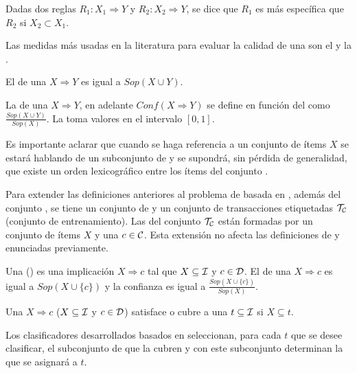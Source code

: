 \begin{defn}[Especificidad]
  Dadas dos reglas $R_1: X_1\Rightarrow Y$ y $R_2: X_2\Rightarrow Y$, se dice que $R_1$ es más específica que $R_2$ si $X_2\subset X_1$.
\label{def:especificidad}
\end{defn}

Las medidas más usadas en la literatura para evaluar la calidad de una \AR son el \soporte y la \confianza.

\begin{defn}
  El \soporte de una \ar $X\Rightarrow Y$ es igual a $Sop(X\cup Y)$.
\label{def:soporte-de-una-AR}
\end{defn}

\begin{defn}
  La \confianza de una \ar $X\Rightarrow Y$, en adelante $Conf(X\Rightarrow Y)$ se define en función del \soporte como $\frac{Sop(X\cup Y)}{Sop(X)}$. La \confianza toma valores en el intervalo $[0,1]$.
\label{def:confianza-de-una-AR}
\end{defn}

Es importante aclarar que cuando se haga referencia a un conjunto de ítems $X$ se estará hablando de un subconjunto de \I y se supondrá, sin pérdida de generalidad, que existe un orden lexicográfico entre los ítems del conjunto \I.

Para extender las definiciones anteriores al problema de \clasificacion basada en \sCARs, además del conjunto \I, se tiene un conjunto de \clases \C y un conjunto de transacciones etiquetadas $\T_\C$ (conjunto de entrenamiento). Las \transacciones del conjunto $\T_\C$ están formadas por un conjunto de ítems $X$ y una \clase $c\in \C$. Esta extensión no afecta las definiciones de \soporte y \confianza enunciadas previamente.

\begin{defn}[\CAR]
  Una \CAR (\sCAR) es una implicación $X\Rightarrow c$ tal que $X\subseteq\I$ y $c\in\D$. El \soporte de una \CAR $X\Rightarrow c$ es igual a $Sop(X\cup\{c\})$ y la confianza es igual a $\frac{Sop(X\cup\{c\})}{Sop(X)}$.
\label{def:CAR}
\end{defn}

\begin{defn}
  Una \CAR $X\Rightarrow c$ ($X\subseteq\I$ y $c\in\D$) satisface o cubre a una \transaccion $t\subseteq\I$ si $X\subseteq t$.
\label{def:cubrimiento-CAR}
\end{defn}

Los clasificadores desarrollados basados en \CARs seleccionan, para cada \transaccion $t$ que se desee clasificar, el subconjunto de \sCARs que la cubren y con este subconjunto determinan la \clase que se asignará a $t$.

